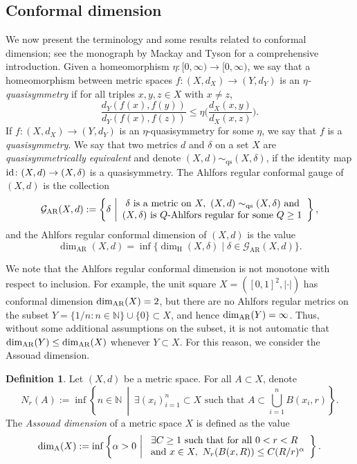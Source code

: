 \documentclass{amsart}
\newcommand{\id}{{\rm id}}
\newcommand{\AR}{{\rm AR}}
\newcommand{\A}{{\rm A}}
\newcommand{\qsequiv}{\sim_{\text{qs}}}
\numberwithin{equation}{section}
\theoremstyle{definition}
\newtheorem{definition}[equation]{Definition}
\theoremstyle{remark}
\newcommand{\N}{\mathbb{N}}
\begin{document}
\subsection{Conformal dimension} We now present the terminology and some results related to conformal dimension; see the monograph \cite{MT} by Mackay and Tyson for a comprehensive introduction.
Given a homeomorphism $\eta\colon[0,\infty)\to[0,\infty)$, we say that a homeomorphism between metric spaces \(f\colon (X,d_X) \to (Y,d_Y)\) is an \emph{\(\eta\)-quasisymmetry} if for all triples \(x,y,z\in X\) with \(x\neq z\),
    \[
    \frac{d_Y(f(x),f(y))}{d_Y(f(x),f(z))}\leq\eta\bigg(\frac{d_X(x,y)}{d_X(x,z)}\bigg).
    \]
    If $f : (X,d_X) \to (Y,d_Y)$ is an $\eta$-quasisymmetry for some $\eta$, we say that $f$ is a \emph{quasisymmetry}. We say that two metrics \(d\) and \(\delta\) on a set  \(X\) are \emph{quasisymmetrically equivalent} and denote \((X,d)\qsequiv(X,\delta)\), if the identity map \(\id\colon (X,d)\to(X,\delta)\) is a quasisymmetry. The Ahlfors regular conformal gauge of \((X,d)\) is the collection
    \[
    \mathcal{G}_{\AR}(X,d):=
        \left\{\delta\ \middle\vert \begin{array}{l}
            \ \delta\text{ is a metric on }X,\ (X,d)\qsequiv(X,\delta)\text{ and}\\
            (X,\delta)\text{ is }Q\text{-Ahlfors regular for some }Q\geq1
        \end{array} \right\},
    \]
and the Ahlfors regular conformal dimension of \((X,d)\) is the value
    \[
    \dim_{\text{AR}}(X,d)=\inf\{\dim_{\mathrm{H}}(X,\delta)\mid \delta \in \mathcal{G}_{\text{AR}}(X,d) \}.
    \]


We note that the Ahlfors regular conformal dimension is not monotone with respect to inclusion. For example, the unit square \(X=([0,1]^2,\lvert \cdot \rvert)\) has conformal dimension $\dim_{\AR}(X)=2$, but there are no Ahlfors regular metrics on the subset $Y= \{1/n : n\in \N\}\cup\{0\}\subset X$, and hence $\dim_{\AR}(Y)=\infty$. Thus, without some additional assumptions on the subset, it is not automatic that $\dim_{\AR}(Y)\leq \dim_{\AR}(X)$ whenever $Y\subset X$. For this reason, we consider the Assouad dimension.

\begin{definition}
    Let \((X,d)\) be a metric space. For all \(A\subset X\), denote
    \[
        N_r(A):=\inf\left\{n\in\N\ \middle\vert\ \exists(x_i)_{i=1}^n\subset X\text{ such that  } A\subset\bigcup_{i=1}^nB(x_i,r)\right\}.
    \]
The \emph{Assouad dimension} of a metric space \(X\) is defined as the value
    \[
        \dim_\A(X):= \inf\left\{ \alpha>0\ \middle\vert\ \begin{array}{l}
        \exists C\geq 1 \text{ such that for all }0<r<R\\
        \text{and } x\in X,\ N_r(B(x,R))\leq C(R/r)^\alpha
        \end{array}\right\}.
    \]
\end{definition}
\end{document}
